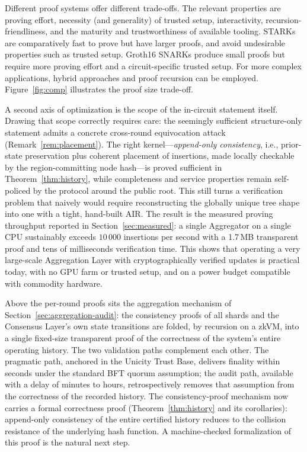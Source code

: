 \documentclass[twocolumn]{article}
\begin{document}
Different proof systems offer different trade-offs. The relevant properties are proving effort, necessity (and generality) of trusted setup, interactivity, recursion-friendliness, and the maturity and trustworthiness of available tooling. STARKs are comparatively fast to prove but have larger proofs, and avoid undesirable properties such as trusted setup. Groth16 SNARKs produce small proofs but require more proving effort and a circuit-specific trusted setup. For more complex applications, hybrid approaches and proof recursion can be employed. Figure~\ref{fig:comp} illustrates the proof size trade-off.

A second axis of optimization is the scope of the in-circuit statement itself. Drawing that scope correctly requires care: the seemingly sufficient structure-only statement admits a concrete cross-round equivocation attack (Remark~\ref{rem:placement}). The right kernel---\emph{append-only consistency}, i.e., prior-state preservation plus coherent placement of insertions, made locally checkable by the region-committing node hash---is proved sufficient in Theorem~\ref{thm:history}, while completeness and service properties remain self-policed by the protocol around the public root. This still turns a verification problem that naively would require reconstructing the globally unique tree shape into one with a tight, hand-built AIR. The result is the measured proving throughput reported in Section~\ref{sec:measured}: a single Aggregator on a single CPU sustainably exceeds $10\,000$ insertions per second with a 1.7\,MB transparent proof and tens of milliseconds verification time. This shows that operating a very large-scale Aggregation Layer with cryptographically verified updates is practical today, with no GPU farm or trusted setup, and on a power budget compatible with commodity hardware.

Above the per-round proofs sits the aggregation mechanism of Section~\ref{sec:aggregation-audit}: the consistency proofs of all shards and the Consensus Layer's own state transitions are folded, by recursion on a zkVM, into a single fixed-size transparent proof of the correctness of the system's entire operating history. The two validation paths complement each other. The pragmatic path, anchored in the Unicity Trust Base, delivers finality within seconds under the standard BFT quorum assumption; the audit path, available with a delay of minutes to hours, retrospectively removes that assumption from the correctness of the recorded history. The consistency-proof mechanism now carries a formal correctness proof (Theorem~\ref{thm:history} and its corollaries): append-only consistency of the entire certified history reduces to the collision resistance of the underlying hash function. A machine-checked formalization of this proof is the natural next step.
\end{document}
